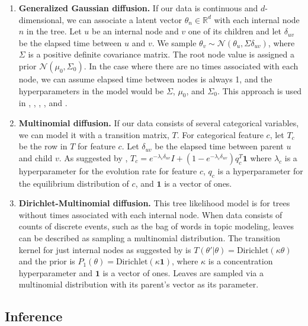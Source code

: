 \documentclass{article}
\begin{document}
\begin{enumerate}
    \item \textbf{Generalized Gaussian diffusion.} If our data
    is continuous and $d$-dimensional, we can associate
    a latent vector $\theta_n \in \mathbb{R}^d$ with each internal node
    $n$ in the tree. Let $u$ be an internal node
    and $v$ one of its children and
    let $\delta_{uv}$ be the elapsed time between $u$ and $v$.
    We sample $\theta_v \sim \mathcal{N}(\theta_u, \Sigma\delta_{uv})$,
    where $\Sigma$ is a positive definite covariance matrix.
    The root node value is assigned a prior
    $\mathcal{N}(\mu_0, \Sigma_0)$.
    In the case where there are no times associated with each node,
    we can assume elapsed time between nodes is always 1,
    and the hyperparameters in the model would be
    $\Sigma$, $\mu_0$, and $\Sigma_0$.
    This approach is used in \citep{Neal2003}, \citep{Teh2009}, \citep{Knowles2015},
    \citep{Adams2010}, \citep{Boyles2012} and \citep{Hu2013}.
    \item \textbf{Multinomial diffusion.} If our data
    consists of several categorical variables, 
    we can model it with a transition matrix, $T$.
    For categorical feature $c$, let $T_c$ 
    be the row in $T$ for feature $c$.
    Let $\delta_{uv}$ be the elapsed time between parent $u$ and child $v$.
    As suggested by
    \citep{Teh2009},
    $T_{c} = e^{-\lambda_{c}\delta_{uv}}I + (1 -  e^{-\lambda_{c}\delta_{uv}})q_{c}^T\bm{1}$
    where $\lambda_{c}$ is a hyperparameter for the evolution rate for feature 
    $c$, $q_{c}$ is a hyperparameter for the equilibrium
    distribution of $c$, and $\bm{1}$ is a vector of ones.
    \item \textbf{Dirichlet-Multinomial diffusion.}
    This tree likelihood model is for
    trees without times associated with each internal node.
    When data consists of counts of discrete events,
    such as the bag of words in topic modeling,
    leaves can be described as sampling
    a multinomial distribution.
    The transition kernel for
    just internal nodes as suggested by \citep{Adams2010} is $T(\theta' | \theta) = \text{Dirichlet}(\kappa\theta)$
    and the prior is $P_1(\theta) = \text{Dirichlet}(\kappa\bm{1})$,
    where $\kappa$ is a concentration hyperparameter and $\bm{1}$ is a
    vector of ones.
    Leaves are sampled via a multinomial distribution
    with its parent's vector as its parameter.
\end{enumerate}

\subsection{Inference}
\end{document}
